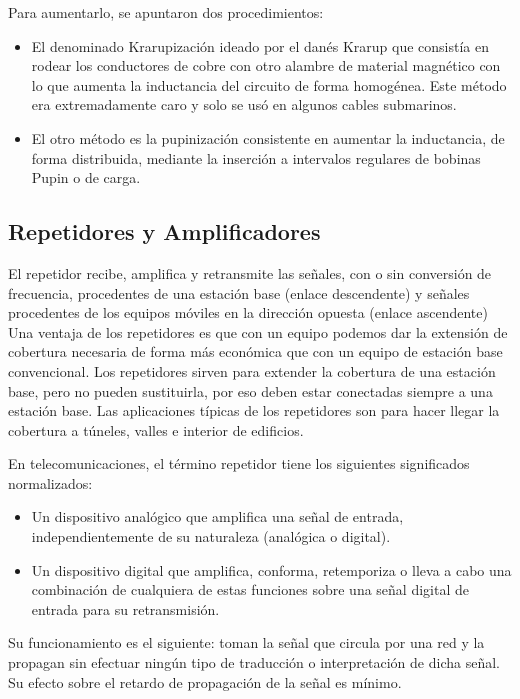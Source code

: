 \documentclass[a4paper]{article}
\begin{document}
Para aumentarlo, se apuntaron dos procedimientos:

\begin{itemize}
\item
  El denominado Krarupización ideado por el danés Krarup que consistía
  en rodear los conductores de cobre con otro alambre de material
  magnético con lo que aumenta la inductancia del circuito de forma
  homogénea. Este método era extremadamente caro y solo se usó en
  algunos cables submarinos.
\item
  El otro método es la pupinización consistente en aumentar la
  inductancia, de forma distribuida, mediante la inserción a intervalos
  regulares de bobinas Pupin o de carga.
\end{itemize}

\subsection{Repetidores y Amplificadores}

El repetidor recibe, amplifica y retransmite las señales, con o sin
conversión de frecuencia, procedentes de una estación base (enlace
descendente) y señales procedentes de los equipos móviles en la
dirección opuesta (enlace ascendente) Una ventaja de los repetidores es
que con un equipo podemos dar la extensión de cobertura necesaria de
forma más económica que con un equipo de estación base convencional. Los
repetidores sirven para extender la cobertura de una estación base, pero
no pueden sustituirla, por eso deben estar conectadas siempre a una
estación base. Las aplicaciones típicas de los repetidores son para
hacer llegar la cobertura a túneles, valles e interior de edificios.

En telecomunicaciones, el término repetidor tiene los siguientes
significados normalizados:

\begin{itemize}
  \item Un dispositivo analógico que amplifica una señal de entrada,
  independientemente de su naturaleza (analógica o digital).

  \item Un dispositivo digital que amplifica, conforma, retemporiza o lleva a
  cabo una combinación de cualquiera de estas funciones sobre una señal
  digital de entrada para su retransmisión.
\end{itemize}

Su funcionamiento es el siguiente: toman la señal que circula por una
red y la propagan sin efectuar ningún tipo de traducción o
interpretación de dicha señal. Su efecto sobre el retardo de propagación
de la señal es mínimo.
\end{document}

